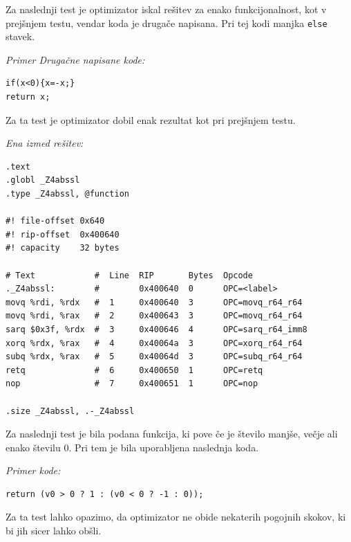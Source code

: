 \documentclass[a4paper, 12pt]{book}
\begin{document}
Za naslednji test je optimizator iskal rešitev za enako funkcijonalnost, kot v prejšnjem testu, vendar koda je drugače napisana. Pri tej kodi manjka \texttt{else} stavek.
\medskip

\noindent
{\it Primer Drugačne napisane kode:}
\begin{Verbatim}[baselinestretch=1]
if(x<0){x=-x;}
return x;
\end{Verbatim}

Za ta test je optimizator dobil enak rezultat kot pri prejšnjem testu.

\medskip

\noindent
{\it Ena izmed rešitev:}
\begin{Verbatim}[baselinestretch=1]
.text
.globl _Z4abssl
.type _Z4abssl, @function

#! file-offset 0x640
#! rip-offset  0x400640
#! capacity    32 bytes

# Text            #  Line  RIP       Bytes  Opcode             
._Z4abssl:        #        0x400640  0      OPC=<label>        
movq %rdi, %rdx   #  1     0x400640  3      OPC=movq_r64_r64   
movq %rdi, %rax   #  2     0x400643  3      OPC=movq_r64_r64   
sarq $0x3f, %rdx  #  3     0x400646  4      OPC=sarq_r64_imm8  
xorq %rdx, %rax   #  4     0x40064a  3      OPC=xorq_r64_r64   
subq %rdx, %rax   #  5     0x40064d  3      OPC=subq_r64_r64   
retq              #  6     0x400650  1      OPC=retq           
nop               #  7     0x400651  1      OPC=nop                        

.size _Z4abssl, .-_Z4abssl
\end{Verbatim}

Za naslednji test je bila podana funkcija, ki pove če je število manjše, večje ali enako številu 0. Pri tem je bila uporabljena naslednja koda.
\medskip

\noindent
{\it Primer kode:}
\begin{Verbatim}[baselinestretch=1]
return (v0 > 0 ? 1 : (v0 < 0 ? -1 : 0));
\end{Verbatim}

Za ta test lahko opazimo, da optimizator ne obide nekaterih pogojnih skokov, ki bi jih sicer lahko obšli.
\medskip
\end{document}
